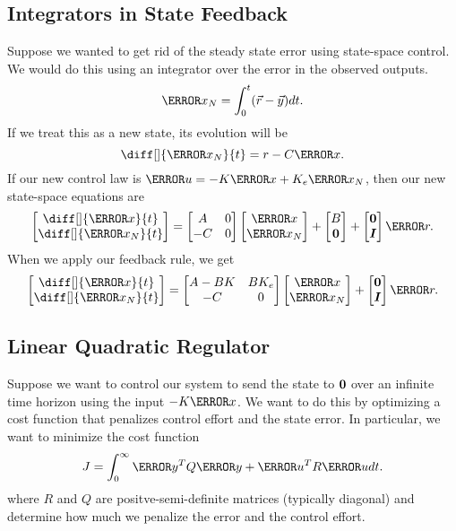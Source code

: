 \subsection{Integrators in State Feedback}
Suppose we wanted to get rid of the steady state error using state-space control. We would do this using an integrator over the error in the observed outputs.
\[
  \V{x}_N = \int_{0}^{t}(\vec{r}-\vec{y})dt.
\]
If we treat this as a new state, its evolution will be
\[
  \diff[]{\V{x}_N}{t} = r - C\V{x}.
\]
If our new control law is $\V{u} = -K\V{x}+K_e\V{x}_N$, then our new state-space equations are
\begin{align*}
  \begin{bmatrix} \diff[]{\V{x}}{t} \\ \diff[]{\V{x}_N}{t} \end{bmatrix}
  = \begin{bmatrix} A & 0 \\ -C & 0 \end{bmatrix} \begin{bmatrix} \V{x} \\ \V{x}_N \end{bmatrix}
  + \begin{bmatrix} B \\ \bs{0} \end{bmatrix} + \begin{bmatrix} \bs{0} \\ \bs{I} \end{bmatrix}\V{r}.
\end{align*}
When we apply our feedback rule, we get 
\begin{align*}
  \begin{bmatrix} \diff[]{\V{x}}{t} \\ \diff[]{\V{x}_N}{t} \end{bmatrix}
  = \begin{bmatrix} A-BK & BK_e \\ -C & 0 \end{bmatrix} \begin{bmatrix} \V{x} \\ \V{x}_N \end{bmatrix}
  + \begin{bmatrix} \bs{0} \\ \bs{I} \end{bmatrix}\V{r}.
\end{align*}
\subsection{Linear Quadratic Regulator}
Suppose we want to control our system to send the state to $\boldsymbol{0}$ over an infinite time horizon using the input $-K\V{x}$.
We want to do this by optimizing a cost function that penalizes control effort and the state error.
In particular, we want to minimize the cost function
\[
  J = \int_{0}^{\infty}\V{y}^TQ\V{y} + \V{u}^TR\V{u} dt.
\]
where $R$ and $Q$ are positve-semi-definite matrices (typically diagonal) and determine how much we penalize the error and the control effort.
